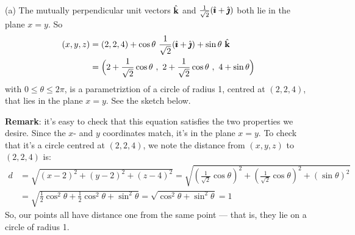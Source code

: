 \begin{solution}
(a) The mutually perpendicular unit vectors $\hat{\mathbf{k}}$ and $\frac1{\sqrt 2}(\hat{\pmb{\imath}}+\hat{\pmb{\jmath}})$ both lie in the plane $x=y$. So
\begin{align*}
(x,y,z) &= (2,2,4) +\cos\theta\  \frac1{\sqrt 2}(\hat{\pmb{\imath}}+\hat{\pmb{\jmath}}) + \sin\theta\ \hat{\mathbf{k}} \\
      &= \Big(2+\frac1{\sqrt 2}\cos\theta~,~2+\frac1{\sqrt 2}\cos\theta~,~4+\sin\theta\Big)
\end{align*}
with $0 \le \theta \le 2\pi$, is a parametriztion of a circle of radius 1, centred at $(2,2,4)$, that lies in the plane $x=y$. See the sketch below.

\begin{center}
\end{center}


\textbf{Remark}: it's easy to check that this equation satisfies the two properties we desire. Since the $x$- and $y$ coordinates match, it's in the plane $x=y$. To check that it's a circle centred at $(2,2,4)$, we note the distance from $(x,y,z)$ to $(2,2,4)$ is:
\begin{align*}
d&=\sqrt{(x-2)^2+(y-2)^2+(z-4)^2}=\sqrt{\left(\frac1{\sqrt 2}\cos\theta\right)^2+\left(\frac1{\sqrt 2}\cos\theta\right)^2+\left(\sin\theta\right)^2}\\
&=\sqrt{\frac12\cos^2\theta+\frac12\cos^2\theta+\sin^2\theta}=\sqrt{\cos^2\theta+\sin^2\theta}=1
\end{align*}
So, our points all have distance one from the same point --- that is, they lie on a circle of radius 1.


\end{solution}
